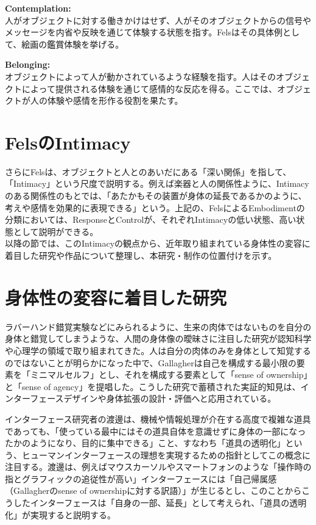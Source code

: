 \textbf{Contemplation:}\\
人がオブジェクトに対する働きかけはせず、人がそのオブジェクトからの信号やメッセージを内省や反映を通じて体験する状態を指す。Felsはその具体例として、絵画の鑑賞体験を挙げる。

\textbf{Belonging:}\\
オブジェクトによって人が動かされているような経験を指す。人はそのオブジェクトによって提供される体験を通じて感情的な反応を得る。ここでは、オブジェクトが人の体験や感情を形作る役割を果たす。

\section{FelsのIntimacy}
さらにFelsは、オブジェクトと人とのあいだにある「深い関係」を指して、「Intimacy」という尺度で説明する。例えば楽器と人の関係性ように、Intimacyのある関係性のもとでは、「あたかもその装置が身体の延長であるかのように、考えや感情を効果的に表現できる」という。上記の、FelsによるEmbodimentの分類においては、ResponseとControlが、それぞれIntimacyの低い状態、高い状態として説明ができる。\\
以降の節では、このIntimacyの観点から、近年取り組まれている身体性の変容に着目した研究や作品について整理し、本研究・制作の位置付けを示す。

\section{身体性の変容に着目した研究}
ラバーハンド錯覚実験などにみられるように、生来の肉体ではないものを自分の身体と錯覚してしまうような、人間の身体像の曖昧さに注目した研究が認知科学や心理学の領域で取り組まれてきた。人は自分の肉体のみを身体として知覚するのではないことが明らかになった中で、Gallagher\cite{Gallagher2000}は自己を構成する最小限の要素を「ミニマルセルフ」とし、それを構成する要素として「sense of ownership」と「sense of agency」を提唱した。こうした研究で蓄積された実証的知見は、インターフェースデザインや身体拡張の設計・評価へと応用されている。

インターフェース研究者の渡邊は、機械や情報処理が介在する高度で複雑な道具であっても、「使っている最中にはその道具自体を意識せずに身体の一部になったかのようになり、目的に集中できる」こと、すなわち「道具の透明化」という、ヒューマンインターフェースの理想を実現するための指針としてこの概念に注目する。渡邊は、例えばマウスカーソルやスマートフォンのような「操作時の指とグラフィックの追従性が高い」インターフェースには「自己帰属感（Gallagherのsense of ownershipに対する訳語）」が生じるとし、このことからこうしたインターフェースは「自身の一部、延長」として考えられ、「道具の透明化」が実現すると説明する\cite{Watanabe2013}。

